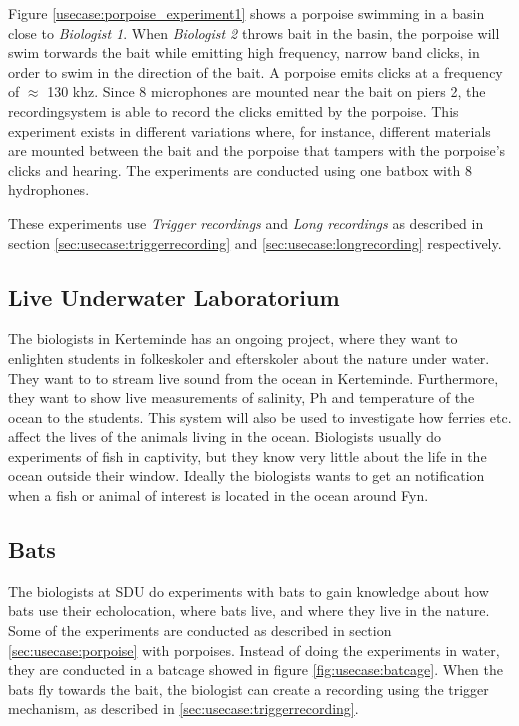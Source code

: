 Figure \ref{usecase:porpoise_experiment1} shows a porpoise swimming in a basin close to \textit{Biologist 1}.
When \textit{Biologist 2} throws bait in the basin, the porpoise will swim torwards the bait while emitting high frequency, narrow band clicks, in order to swim in the direction of the bait. A porpoise emits clicks at a frequency of $\approx$ 130 khz.
Since 8 microphones are mounted near the bait on piers 2, the recordingsystem is able to record the clicks emitted by the porpoise. This experiment exists in different variations where, for instance, different materials are mounted between the bait and the porpoise that tampers with the porpoise's clicks and hearing. The experiments are conducted using one batbox with 8 hydrophones.

These experiments use \textit{Trigger recordings} and \textit{Long recordings} as described in section \ref{sec:usecase:triggerrecording} and \ref{sec:usecase:longrecording} respectively.

\subsection{Live Underwater Laboratorium}
The biologists in Kerteminde has an ongoing project, where they want to enlighten students in folkeskoler and efterskoler about the nature under water. They want to to stream live sound from the ocean in Kerteminde. Furthermore, they want to show live measurements of salinity, Ph and temperature of the ocean to the students.
This system will also be used to investigate how ferries etc. affect the lives of the animals living in the ocean. Biologists usually do experiments of fish in captivity, but they know very little about the life in the ocean outside their window. Ideally the biologists wants to get an notification when a fish or animal of interest is located in the ocean around Fyn.


\subsection{Bats}
The biologists at SDU do experiments with bats to gain knowledge about how bats use their echolocation, where bats live, and where they live in the nature.
Some of the experiments are conducted as described in section \ref{sec:usecase:porpoise} with porpoises. Instead of doing the experiments in water, they are conducted in a batcage showed in figure \ref{fig:usecase:batcage}. When the bats fly towards the bait, the biologist can create a recording using the trigger mechanism, as described in \ref{sec:usecase:triggerrecording}.

